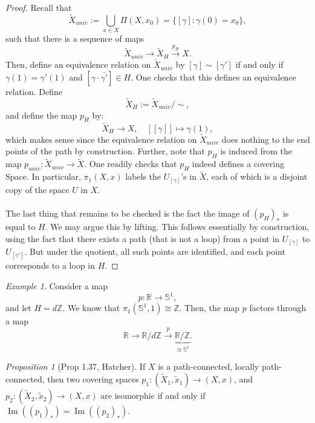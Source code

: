 \documentclass[a4paper]{report}
\theoremstyle{definition}
\theoremstyle{remark}
\theoremstyle{proposition}
\newtheorem{proposition}{Proposition}
\theoremstyle{conjecture}
\theoremstyle{lemma}
\theoremstyle{corollary}
\theoremstyle{exercise}
\newtheorem{example}{Example}
\newcommand{\on}{\operatorname}
\begin{document}
\begin{proof}
    Recall that 
    $$\widetilde{X}_{univ} := \bigcup_{x \in X} \Pi(X,x_0) = \lbrace [\gamma] : \gamma(0) = x_0\rbrace,$$
    such that there is a sequence of maps 
    $$\widetilde{X}_{univ} \longrightarrow \widetilde{X}_H \stackrel{p_H}{\longrightarrow} X.$$
    Then, define an equivalence relation on $\widetilde{X}_{univ}$ by
    $[\gamma] \sim [\gamma']$ if and only if $\gamma(1) = \gamma'(1)$ and 
    $[\gamma \cdot \bar{\gamma'}] \in H$.
    One checks that this defines an equivalence relation. 
    Define $$\widetilde{X}_H := \widetilde{X}_{univ} / \sim,$$
    and define the map $p_H$ by:
    $$\widetilde{X}_H \longrightarrow X,\quad [[\gamma]] \longmapsto \gamma(1),$$
    which makes sense since the equivalence relation on $\widetilde{X}_{univ}$ 
    does nothing to the end points of the path by construction.
    Further, note that $p_H$ is induced from the map $p_{univ} : \widetilde{X}_{univ} \to \widetilde{X}$.
    One readily checks that $p_H$ indeed defines a covering Space. 
    In particular, $\pi_1(X,x)$ labels the $U_{[\gamma]}$'s in $\widetilde{X}$, each of 
    which is a disjoint copy of the space $U$ in $X$. \\\\ 
    The last thing that remains to be checked is the fact the image of $(p_H)_\ast$
    is equal to $H$. We may argue this by lifting. This follows essentially by construction, 
    using the fact that there exists a path (that is not a loop) from a point in 
    $U_{[\gamma]}$ to $U_{[\gamma']}$. But under the quotient, all such points are identified,
    and each point corresponds to a loop in $H$.
\end{proof}

\begin{example}
    Consider a map 
    $$p : \mathbb{R} \longrightarrow \mathbb{S}^1,$$
    and let $H = d\mathbb{Z}$. We know that $\pi_1(\mathbb{S}^1,1) \cong \mathbb{Z}$.
    Then, the map $p$ factors through a map 
    $$\mathbb{R} \longrightarrow \mathbb{R}/d\mathbb{Z} \stackrel{p}{\longrightarrow} \underbrace{\mathbb{R}/\mathbb{Z}}_{\cong \mathbb{S}^1}.$$
\end{example}

\begin{proposition}[Prop 1.37, Hatcher]
    If $X$ is a path-connected, locally path-connected, then two 
    covering spaces $p_1 : (\widetilde{X}_1, \widetilde{x}_1) \to (X,x)$,
    and $p_2 : (\widetilde{X}_2,\widetilde{x}_2) \to (X,x)$
    are isomorphic if and only if $\on{Im}((p_1)_\ast) = \on{Im}((p_2)_\ast)$.
\end{proposition}
\end{document}
